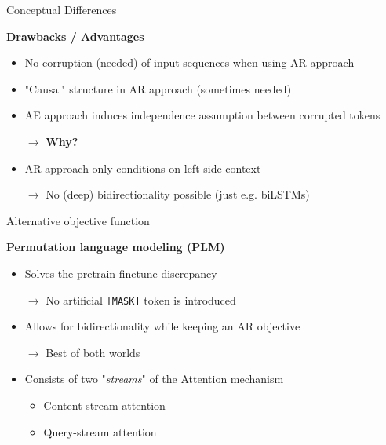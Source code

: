 
\begin{frame}{Conceptual Differences}

\vfill
	
	\textbf{Drawbacks / Advantages}
	
	\begin{itemize}
		\item No corruption (needed) of input sequences when using AR approach
		\item "Causal" structure in AR approach (sometimes needed)
		\item AE approach induces independence assumption between corrupted tokens
		\item[$\to$] \textbf{Why?}
		\item AR approach only conditions on left side context
		\item[$\to$] No (deep) bidirectionality possible (just e.g. biLSTMs)
	\end{itemize}
	
\vfill

\end{frame}


\begin{frame}{Alternative objective function}

\vfill

	\textbf{Permutation language modeling (PLM)}
	
	\begin{itemize}
		\item Solves the pretrain-finetune discrepancy
		\item[$\to$] No artificial \texttt{[MASK]} token is introduced
		\item Allows for bidirectionality while keeping an AR objective
		\item[$\to$] Best of both worlds
		\item Consists of two "\textit{streams}" of the Attention mechanism
				\begin{itemize}
					\item Content-stream attention
					\item Query-stream attention
				\end{itemize}
	\end{itemize}
	
\vfill

\end{frame}

